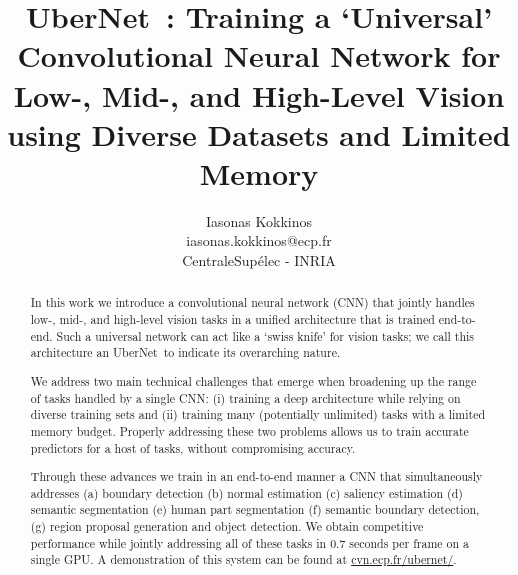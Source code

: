 \documentclass[10pt,twocolumn,letterpaper]{article}
\begin{document}
\newcommand{\ba}{\begin{eqnarray}}
\newcommand{\ea}{\end{eqnarray}}
\newcommand{\scln}{.17}
\newcommand{\sclhl}{.09}
\newcommand{\sclq}{.05}


\newcommand{\ubernet}{UberNet~}
\title{\ubernet: Training a `Universal' Convolutional Neural Network for Low-, Mid-, and High-Level Vision using Diverse Datasets and   Limited Memory}
	\author{Iasonas Kokkinos\\
	iasonas.kokkinos@ecp.fr\\
	CentraleSup\'elec - INRIA 
	}
	
	\sloppy
	\maketitle
	\thispagestyle{empty}
	
\begin{abstract}
In this work we  introduce a convolutional neural network (CNN) that jointly handles low-, mid-, and high-level vision tasks in a  unified architecture that is trained end-to-end.  Such a universal  network can act like a `swiss knife' for vision tasks;  we call this architecture an \ubernet to indicate its overarching nature. 
	
We address two main technical challenges that emerge when broadening up the range of tasks handled by a single CNN: (i) training a deep architecture while relying on diverse training sets and (ii) training many (potentially unlimited) tasks with a limited memory budget.
Properly addressing these two problems allows us to train  accurate predictors for a host of tasks, without compromising accuracy. 

Through these advances we train in an end-to-end manner a CNN that  simultaneously addresses (a) boundary detection (b) normal estimation (c) saliency estimation (d) semantic segmentation (e) human part segmentation (f) semantic boundary detection, (g) region proposal generation and object detection. We obtain competitive performance while jointly addressing all of these tasks in 0.7 seconds per frame on a single GPU. A demonstration  of this system can be found at \url{cvn.ecp.fr/ubernet/}.
\end{abstract}
\maketitle
\end{document}
